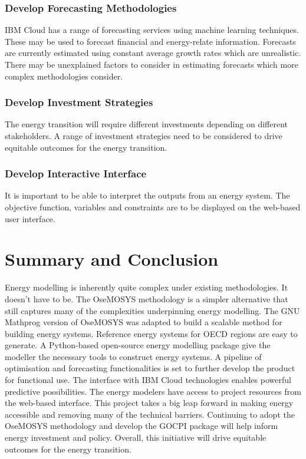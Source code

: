 \documentclass[12pt]{article}
\begin{document}
\subsubsection{Develop Forecasting Methodologies}
IBM Cloud has a range of forecasting services using machine learning techniques. These may be used to forecast financial and energy-relate information.
Forecasts are currently estimated using constant average growth rates which are unrealistic.
There may be unexplained factors to consider in estimating forecasts which more complex methodologies consider.
\subsubsection{Develop Investment Strategies}
The energy transition will require different investments depending on different stakeholders.
A range of investment strategies need to be considered to drive equitable outcomes for the energy transition.
\subsubsection{Develop Interactive Interface}
It is important to be able to interpret the outputs from an energy system. The objective function, variables and constraints are to be displayed
on the web-based user interface.
\section{Summary and Conclusion}
Energy modelling is inherently quite complex under existing methodologies.
It doesn't have to be. 
The OseMOSYS methodology is a simpler alternative that still captures many of the complexities underpinning energy modelling.
The GNU Mathprog version of OseMOSYS was adapted to build a scalable method for building energy systems.
Reference energy systems for OECD regions are easy to generate.
A Python-based open-source energy modelling package give the modeller the necessary tools to construct energy systems.
A pipeline of optimisation and forecasting functionalities is set to further develop the product for functional use.
The interface with IBM Cloud technologies enables powerful predictive possibilities.
The energy modelers have access to project resources from the web-based interface.
This project takes a big leap forward in making energy accessible and removing many of the technical barriers.
Continuing to adopt the OseMOSYS methodology and develop the GOCPI package will help inform energy investment and policy. 
Overall, this initiative will drive equitable outcomes for the energy transition.
\end{document}
